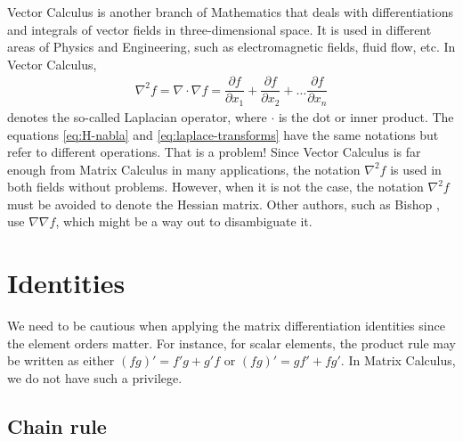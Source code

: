 \documentclass{article}
\begin{document}
Vector Calculus is another branch of Mathematics that deals with differentiations and integrals of vector fields in three-dimensional space. It is used in different areas of Physics and Engineering, such as electromagnetic fields, fluid flow, etc. In Vector Calculus, 
\begin{align}
    \nabla^2 f = \nabla \cdot \nabla f = \dfrac{\partial f}{\partial x_1} + \dfrac{\partial f}{\partial x_2} + \dots \dfrac{\partial f}{\partial x_n}
    \label{eq:laplace-transforms}
\end{align}
denotes the so-called Laplacian operator, where \(\cdot\) is the dot or inner product. The equations \eqref{eq:H-nabla} and \eqref{eq:laplace-transforms} have the same notations but refer to different operations. That is a problem! Since Vector Calculus is far enough from Matrix Calculus in many applications, the notation \(\nabla^2 f\) is used in both fields without problems. However, when it is not the case, the notation \(\nabla^2 f\) must be avoided to denote the Hessian matrix. Other authors, such as Bishop \cite{bishopPatternRecognitionMachine2006}, use \(\nabla \nabla f\), which might be a way out to disambiguate it.

\section{Identities}
\label{sec:identities}

We need to be cautious when applying the matrix differentiation identities since the element orders matter. For instance, for scalar elements, the product rule may be written as either \((fg)' = f'g + g'f\) or \((fg)' = g f' + f g'\). In Matrix Calculus, we do not have such a privilege.

\subsection{Chain rule}
\end{document}
